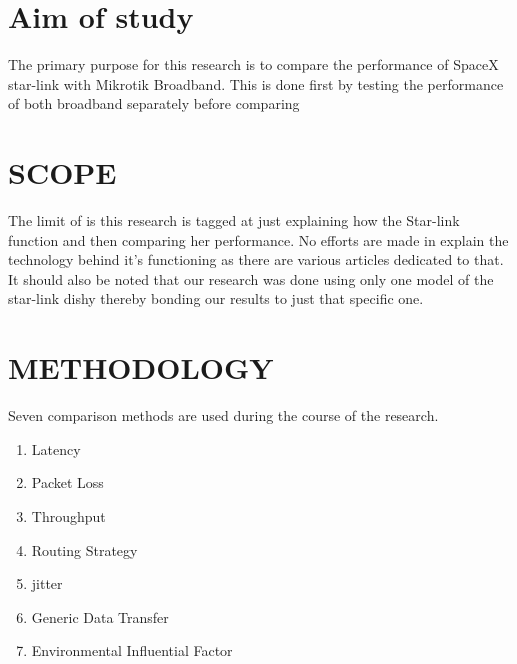 \section{Aim of study}
The primary purpose for this research is to compare the performance of SpaceX star-link with Mikrotik Broadband. This is done first by testing the performance of both broadband separately before comparing
\section{SCOPE}
The limit of is this research is tagged at just explaining how the Star-link function and then comparing her performance. No efforts are made in explain the technology behind it's functioning as there are various articles dedicated to that. It should also be noted that  our research was done using only one model of the star-link dishy thereby bonding our results to just that specific one.
\section{METHODOLOGY}
Seven comparison methods are used during the course of the research.
\begin{enumerate}
\item Latency
\item Packet Loss
\item Throughput
\item Routing Strategy
\item jitter
\item Generic Data Transfer
\item Environmental Influential Factor
\end{enumerate}

